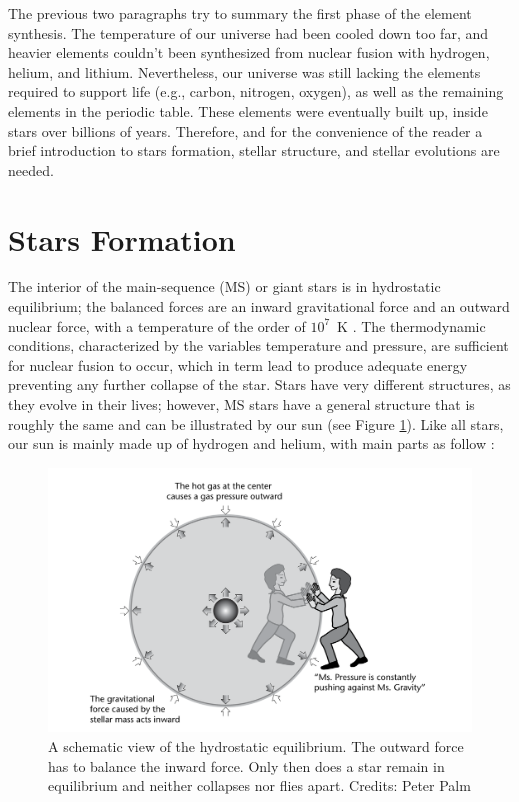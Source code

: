 The previous two paragraphs try to summary the first phase of the element synthesis. The temperature of our universe had been cooled down too far, and heavier elements couldn't been synthesized from nuclear fusion with hydrogen, helium, and lithium. Nevertheless, our universe was still lacking the elements required to support life (e.g., carbon, nitrogen, oxygen), as well as the remaining elements in the periodic table. These elements were eventually built up, inside stars over billions of years. Therefore, and for the convenience of the reader a brief introduction to stars formation, stellar structure, and stellar evolutions are needed.




\section{Stars Formation}\label{formation}
The interior of the main-sequence (MS) or giant stars is in hydrostatic equilibrium; the balanced forces are an inward gravitational force and an outward nuclear force, with a temperature of the order of ${10^7}$~K \citep{leblanc2010introduction}. The thermodynamic conditions, characterized by the variables temperature and pressure, are sufficient for nuclear fusion to occur, which in term lead to produce adequate energy preventing any further collapse of the star. Stars have very different structures, as they evolve in their lives; however, MS stars have a general structure that is roughly the same and can be illustrated by our sun (see Figure \ref{fig:sun}). Like all stars, our sun is mainly made up of hydrogen and helium, with main parts as follow \citep{1972RvGSP..10..395G}:



\begin{figure}[!ht]
\centering
\includegraphics[width=\textwidth, angle=0]{Img/gravity_vs_nuclear.png}
\caption{A schematic view of the hydrostatic equilibrium. The outward force has to balance the inward force. Only then does a star remain in equilibrium and neither collapses nor flies apart. Credits: Peter Palm} 
\label{fig:sun}
\end{figure}



